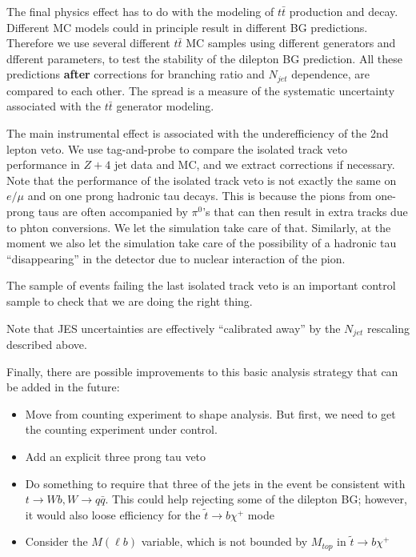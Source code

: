 The final physics effect has to do with the modeling of $t\bar{t}$ production and decay.  Different
MC models could in principle result in different BG predictions.  Therefore we use several different 
$t\bar{t}$ MC samples using different generators and dfferent parameters, to test the stability
of the dilepton BG prediction.  All these predictions {\bf after} corrections for branching ratio
and $N_{jet}$ dependence, are compared to each other.  The spread is a measure of the systematic
uncertainty associated with the $t\bar{t}$ generator modeling.

The main instrumental effect is associated with the underefficiency of the 2nd lepton veto.
We use tag-and-probe to compare the isolated track veto performance in $Z + 4$ jet data and 
MC, and we extract corrections if necessary.  Note that the performance of the isolated track veto 
is not exactly the same on $e/\mu$ and on one prong hadronic tau decays.  This is because
the pions from one-prong taus are often accompanied by $\pi^0$'s that can then result in extra 
tracks due to phton conversions.  We let the simulation take care of that.  Similarly, at the moment
we also let the simulation take care of the possibility of a hadronic tau ``disappearing'' in the
detector due to nuclear interaction of the pion.

The sample of events failing the last isolated track veto is an important control sample to 
check that we are doing the right thing.

Note that JES uncertainties are effectively ``calibrated away'' by the $N_{jet}$ rescaling described 
above.  

Finally, there are possible improvements to this basic analysis strategy that can be added in the future:
\begin{itemize}
\item Move from counting experiment to shape analysis.  But first, we need to get the counting
experiment under control.
\item Add an explicit three prong tau veto
\item Do something to require that three of the jets in the event be consistent with $t \to Wb, W \to q\bar{q}$.
This could help rejecting some of the dilepton BG; however, it would also loose efficiency for 
the $\widetilde{t} \to b \chi^+$ mode
\item Consider the $M(\ell b)$ variable, which is not bounded by $M_{top}$ in $\widetilde{t} \to b \chi^+$
\end{itemize}